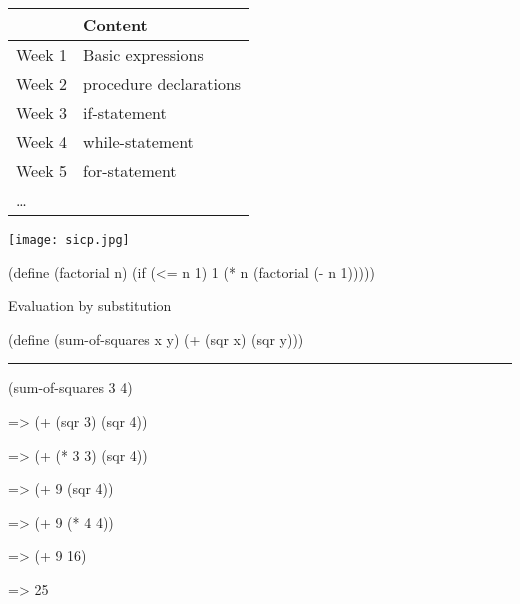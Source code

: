 \begin{frame}
\centering
\begin{tabular}{|l|l|}
\hline
       & Content \\
\hline\hline
Week 1 & Basic expressions  \\
\hline
Week 2 & procedure declarations \\
\hline
Week 3 & if-statement \\
\hline
Week 4 & while-statement \\
\hline
Week 5 & for-statement \\
\hline
\ldots & \\
\end{tabular}
\end{frame}


\begin{frame}
\centering
\texttt{[image: sicp.jpg]}
\end{frame}


\begin{frame}[fragile]
\begin{schemecode}
(define (factorial n)
  (if (<= n 1)
      1
      (* n (factorial (- n 1)))))
\end{schemecode}
\end{frame}


\begin{frame}[fragile]
Evaluation by substitution

\begin{schemecode}
(define (sum-of-squares x y)
  (+ (sqr x) (sqr y)))
\end{schemecode}

\nl
\hrule
\pnl

\begin{schemecode}
     (sum-of-squares 3 4)
\end{schemecode}
\pause
\begin{schemecode}
=>   (+ (sqr 3) (sqr 4))
\end{schemecode}
\pause
\begin{schemecode}
=>   (+ (* 3 3) (sqr 4))
\end{schemecode}
\pause
\begin{schemecode}
=>   (+ 9 (sqr 4))
\end{schemecode}
\pause
\begin{schemecode}
=>   (+ 9 (* 4 4))
\end{schemecode}
\pause
\begin{schemecode}
=>   (+ 9 16)
\end{schemecode}
\pause
\begin{schemecode}
=>   25
\end{schemecode}
\end{frame}


